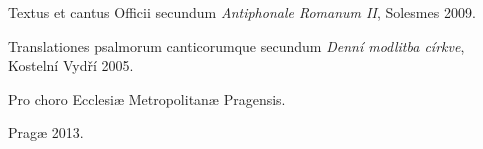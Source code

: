 \documentclass[a5paper, twoside, 12pt]{article}
\begin{document}
\trResp

\vfill

\pagebreak





\sci


\vfill


\pagebreak

\pagestyle{empty}

\mbox{}
\vfill

Textus et cantus Officii secundum
\emph{Antiphonale Romanum II}, Solesmes 2009.

Translationes psalmorum canticorumque secundum 
\emph{Denní modlitba církve}, Kostelní Vydří 2005.

\begin{center}
Pro choro Ecclesiæ Metropolitanæ Pragensis.

Pragæ 2013.
\end{center}
\end{document}
